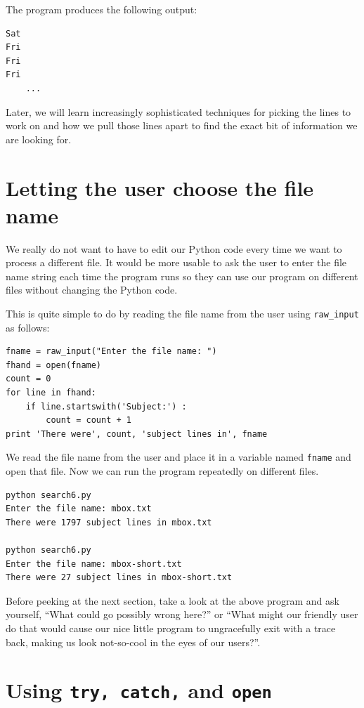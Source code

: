 \documentclass[10pt]{book}
\begin{document}
The program produces the following output:

\beforeverb
\begin{verbatim}
Sat
Fri
Fri
Fri
    ...
\end{verbatim}
\afterverb
%
Later, we will learn increasingly sophisticated techniques for
picking the lines to work on and how we pull those lines apart
to find the exact bit of information we are looking for.

\section{Letting the user choose the file name}

We really do not want to have to edit our Python code
every time we want to process a different file.  It would 
be more usable to ask the user to enter the file name string 
each time the program runs so they can use our 
program on different files without changing the Python code.

This is quite simple to do by reading the file name from
the user using \verb"raw_input" as follows:

\beforeverb
\begin{verbatim}
fname = raw_input("Enter the file name: ")
fhand = open(fname)
count = 0
for line in fhand:
    if line.startswith('Subject:') :
        count = count + 1
print 'There were', count, 'subject lines in', fname
\end{verbatim}
\afterverb
%
We read the file name from the user and place it in a variable
named {\tt fname} and open that file.  Now we can run the program 
repeatedly on different files.

\beforeverb
\begin{verbatim}
python search6.py 
Enter the file name: mbox.txt
There were 1797 subject lines in mbox.txt

python search6.py 
Enter the file name: mbox-short.txt
There were 27 subject lines in mbox-short.txt
\end{verbatim}
\afterverb
%
Before peeking at the next section, take a look at the above program
and ask yourself, ``What could go possibly wrong here?'' or ``What might our
friendly user do that would cause our nice little program to 
ungracefully exit with a trace back, making us look not-so-cool 
in the eyes of our users?''.

\section{Using {\tt try, catch,} and {\tt open}}
\end{document}
